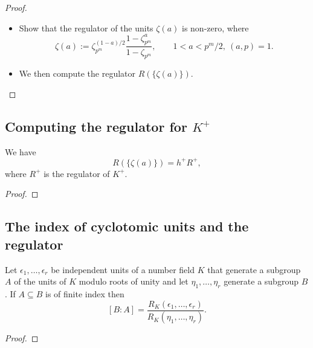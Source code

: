 \begin{proof}
    \begin{itemize}
        \item Show that the regulator of the units $\zeta(a)$ is non-zero, where 
        $$
        \zeta(a) := \zeta_{p^m}^{(1-a)/2} \frac{1 - \zeta_{p^m}^a}{1 - \zeta_{p^m}}, \qquad 1 < a < p^m / 2, \ (a, p) = 1.
        $$
        \item We then compute the regulator $R(\{\zeta(a)\})$. 
    \end{itemize}
\end{proof}

\subsection{Computing the regulator for $K^+$}

\begin{lemma}\label{lem:regRa}
    We have 
    $$
    R(\{\zeta(a)\}) = h^+ R^+, 
    $$
    where $R^+$ is the regulator of $K^+$.
\end{lemma}

\begin{proof}
\end{proof}

\subsection{The index of cyclotomic units and the regulator}

\begin{lemma}\label{lem:index-reg}
Let $\epsilon_1, \dots, \epsilon_r$ be independent units of a number field $K$ that generate a subgroup 
$A$ of the units of $K$ modulo roots of unity and let $\eta_1, \dots, \eta_r$ generate a subgroup 
$B$. If $A \subseteq B$ is of finite index then 
$$
[B : A] = \frac{R_K(\epsilon_1, \dots, \epsilon_r)}{R_K(\eta_1, \dots, \eta_r)}.
$$
\end{lemma}

\begin{proof}
\end{proof}